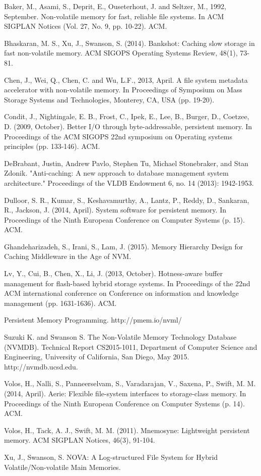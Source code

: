 \documentclass[letterpaper, 10 pt, conference]{ieeeconf}  %
\begin{document}
\begin{thebibliography}{99}

 Baker, M., Asami, S., Deprit, E., Ouseterhout, J. and Seltzer, M., 1992, September. Non-volatile memory for fast, reliable file systems. In ACM SIGPLAN Notices (Vol. 27, No. 9, pp. 10-22). ACM.

 Bhaskaran, M. S., Xu, J., Swanson, S. (2014). Bankshot: Caching slow storage in fast non-volatile memory. ACM SIGOPS Operating Systems Review, 48(1), 73-81.	

 Chen, J., Wei, Q., Chen, C. and Wu, L.F., 2013, April. A file system metadata accelerator with non-volatile memory. In Proceedings of Symposium on Mass Storage Systems and Technologies, Monterey, CA, USA (pp. 19-20).

 Condit, J., Nightingale, E. B., Frost, C., Ipek, E., Lee, B., Burger, D.,  Coetzee, D. (2009, October). Better I/O through byte-addressable, persistent memory. In Proceedings of the ACM SIGOPS 22nd symposium on Operating systems principles (pp. 133-146). ACM.

 DeBrabant, Justin, Andrew Pavlo, Stephen Tu, Michael Stonebraker, and Stan Zdonik. "Anti-caching: A new approach to database management system architecture." Proceedings of the VLDB Endowment 6, no. 14 (2013): 1942-1953.

 Dulloor, S. R., Kumar, S., Keshavamurthy, A., Lantz, P., Reddy, D., Sankaran, R., Jackson, J. (2014, April). System software for persistent memory. In Proceedings of the Ninth European Conference on Computer Systems (p. 15). ACM.

 Ghandeharizadeh, S., Irani, S., Lam, J. (2015). Memory Hierarchy Design for Caching Middleware in the Age of NVM.

 Lv, Y., Cui, B., Chen, X., Li, J. (2013, October). Hotness-aware buffer management for flash-based hybrid storage systems. In Proceedings of the 22nd ACM international conference on Conference on information and knowledge management (pp. 1631-1636). ACM.	

 Persistent Memory Programming. http://pmem.io/nvml/

 Suzuki K. and Swanson S. The Non-Volatile Memory Technology Database (NVMDB). Technical Report CS2015-1011, Department of Computer Science and Engineering, University of California, San Diego, May 2015. http://nvmdb.ucsd.edu.

 Volos, H., Nalli, S., Panneerselvam, S., Varadarajan, V., Saxena, P., Swift, M. M. (2014, April). Aerie: Flexible file-system interfaces to storage-class memory. In Proceedings of the Ninth European Conference on Computer Systems (p. 14). ACM.

 Volos, H., Tack, A. J., Swift, M. M. (2011). Mnemosyne: Lightweight persistent memory. ACM SIGPLAN Notices, 46(3), 91-104.	

 Xu, J., Swanson, S. NOVA: A Log-structured File System for Hybrid Volatile/Non-volatile Main Memories.

\end{thebibliography}
\end{document}
